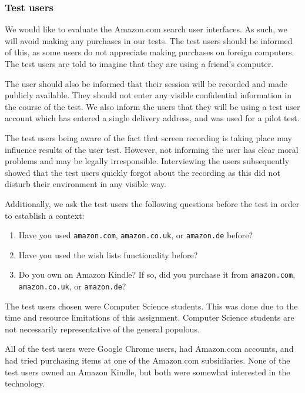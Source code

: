 \subsubsection{Test users}

We would like to evaluate the Amazon.com search user interfaces. As such, we
will avoid making any purchases in our tests. The test users should be informed
of this, as some users do not appreciate making purchases on foreign computers.
The test users are told to imagine that they are using a friend's computer.

The user should also be informed that their session will be recorded and made
publicly available. They should not enter any visible confidential information
in the course of the test. We also inform the users that they will be using a
test user account which has entered a single delivery address, and was used for
a pilot test.

The test users being aware of the fact that screen recording is taking place
may influence results of the user test\cite{molich}. However, not informing the
user has clear moral problems and may be legally irresponsible. Interviewing
the users subsequently showed that the test users quickly forgot about the
recording as this did not disturb their environment in any visible way.

Additionally, we ask the test users the following questions before the test in
order to establish a context:

\begin{enumerate}

\item Have you used \texttt{amazon.com}, \texttt{amazon.co.uk}, or
\texttt{amazon.de} before?

\item Have you used the wish lists functionality before?

\item Do you own an Amazon Kindle? If so, did you purchase it from
\texttt{amazon.com}, \texttt{amazon.co.uk}, or \texttt{amazon.de}?

\end{enumerate}

The test users chosen were Computer Science students. This was done due to the
time and resource limitations of this assignment. Computer Science students are
not necessarily representative of the general populous\cite[.3]{hearst}.

All of the test users were Google Chrome users, had Amazon.com accounts, and
had tried purchasing items at one of the Amazon.com subsidiaries. None of the
test users owned an Amazon Kindle, but both were somewhat interested in the
technology.

